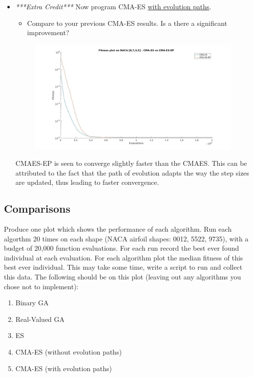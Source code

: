 \documentclass{article}
\begin{document}
\begin{itemize}
	\item \textit{***Extra Credit***} Now program CMA-ES \underline{with evolution paths}.
		\begin{itemize}
		\item Compare to your previous CMA-ES results. Is a there a significant improvement?
		\end{itemize}
		
		\begin{figure}[H]
			\centering
			\includegraphics[width=1.0\textwidth]{img/cmaes_cmaesep.jpeg}
		\end{figure}
		\color{blue}
		CMAES-EP is seen to converge slightly faster than the CMAES. This can be attributed to the fact that the path of evolution adapts the way the step sizes are updated, thus leading to faster convergence.
		\color{black}
\end{itemize}

\newpage
\subsection{Comparisons}
Produce one plot which shows the performance of each algorithm. Run each algorthm 20 times on each shape (NACA airfoil shapes: 0012, 5522, 9735), with a budget of 20,000 function evaluations. For each run record the best ever found individual at each evaluation. For each algorithm plot the median fitness of this best ever individual. This may take some time, write a script to run and collect this data. The following should be on this plot (leaving out any algorithms you chose not to implement):
\begin{enumerate}
	\item Binary GA
	\item Real-Valued GA
	\item ES
	\item CMA-ES (without evolution paths)
	\item CMA-ES (with evolution paths)
\end{enumerate}
\end{document}
